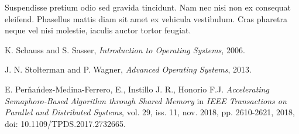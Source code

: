 \documentclass[conference]{IEEEtran}
\begin{document}
 
Suspendisse pretium odio sed gravida tincidunt. Nam nec nisi non ex consequat eleifend. Phasellus mattis diam sit amet ex vehicula vestibulum. Cras pharetra neque vel nisi molestie, iaculis auctor tortor feugiat.



\begin{thebibliography}{99}

K. Schauss and S. Sasser, \textit{Introduction to Operating Systems}, 2006.

J. N. Stolterman and P. Wagner, \textit{Advanced Operating Systems}, 2013.

E. Perňańdez-Medina-Ferrero, E., Instillo J. R., Honorio F.J. \textit{Accelerating Semaphoro-Based Algorithm through Shared Memory}
 in \textit{IEEE Transactions on Parallel and Distributed Systems}, vol. 29, iss. 11, nov. 2018, pp. 2610-2621, 2018, doi: 10.1109/TPDS.2017.2732665.


\end{thebibliography}
\end{document}
